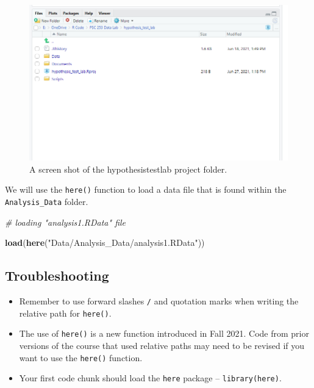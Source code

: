 \documentclass[
]{book}
\newenvironment{Shaded}{\begin{snugshade}}{\end{snugshade}}
\newcommand{\CommentTok}[1]{\textcolor[rgb]{0.56,0.35,0.01}{\textit{#1}}}
\newcommand{\FunctionTok}[1]{\textcolor[rgb]{0.13,0.29,0.53}{\textbf{#1}}}
\newcommand{\NormalTok}[1]{#1}
\newcommand{\StringTok}[1]{\textcolor[rgb]{0.31,0.60,0.02}{#1}}
\providecommand{\tightlist}{%
  \setlength{\itemsep}{0pt}\setlength{\parskip}{0pt}}
\begin{document}
\begin{figure}
\centering
\includegraphics{images/here_example1.png}
\caption{\label{fig:here-example}A screen shot of the hypothesistestlab project folder.}
\end{figure}

We will use the \texttt{here()} function to load a data file that is found within the \texttt{Analysis\_Data} folder.

\begin{Shaded}
\begin{Highlighting}[]
\CommentTok{\# loading "analysis1.RData" file}

\FunctionTok{load}\NormalTok{(}\FunctionTok{here}\NormalTok{(}\StringTok{"Data/Analysis\_Data/analysis1.RData"}\NormalTok{))}
\end{Highlighting}
\end{Shaded}

\hypertarget{troubleshooting-6}{%
\subsection{Troubleshooting}\label{troubleshooting-6}}

\begin{itemize}
\tightlist
\item
  Remember to use forward slashes \texttt{/} and quotation marks when writing the relative path for \texttt{here()}.
\item
  The use of \texttt{here()} is a new function introduced in Fall 2021. Code from prior versions of the course that used relative paths may need to be revised if you want to use the \texttt{here()} function.
\item
  Your first code chunk should load the \texttt{here} package -- \texttt{library(here)}.
\end{itemize}
\end{document}
